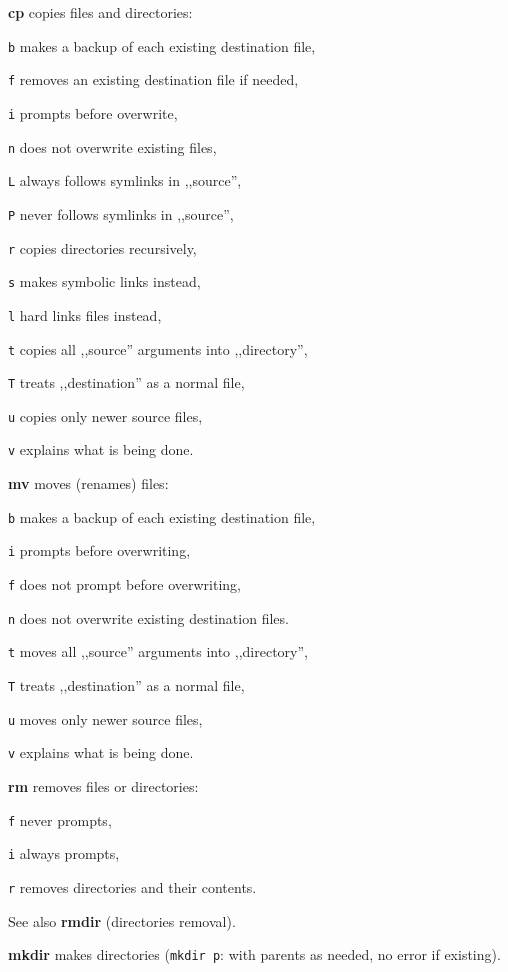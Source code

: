 \begin{enumx}
	\item [\cmdblack] \textbf{cp} copies files and directories:
	\item [\texttt{b}] makes a backup of each existing destination file,
	\item [\texttt{f}] removes an existing destination file if needed,
	\item [\texttt{i}] prompts before overwrite,
	\item [\texttt{n}] does not overwrite existing files,
	\item [\texttt{L}] always follows symlinks in ,,source'',
	\item [\texttt{P}] never follows symlinks in ,,source'',
	\item [\texttt{r}] copies directories recursively,
	\item [\texttt{s}] makes symbolic links instead,
	\item [\texttt{l}] hard links files instead,
	\item [\texttt{t}] copies all ,,source'' arguments into ,,directory'',
	\item [\texttt{T}] treats ,,destination'' as a normal file,
	\item [\texttt{u}] copies only newer source files,
	\item [\texttt{v}] explains what is being done.
	
	\item [\cmdblack] \textbf{mv} moves (renames) files:
	\item [\texttt{b}] makes a backup of each existing destination file,
	\item [\texttt{i}] prompts before overwriting,
	\item [\texttt{f}] does not prompt before overwriting,
	\item [\texttt{n}] does not overwrite existing destination files.
	\item [\texttt{t}] moves all ,,source'' arguments into ,,directory'',
	\item [\texttt{T}] treats ,,destination'' as a normal file,
	\item [\texttt{u}] moves only newer source files,
	\item [\texttt{v}] explains what is being done.
	
	\item [\cmdblack] \textbf{rm} removes files or directories:
	\item [\texttt{f}] never prompts,
	\item [\texttt{i}] always prompts,
	\item [\texttt{r}] removes directories and their contents.

	\item [\cmdblack] See also \textbf{rmdir} (directories removal).

	\item [\cmdblack] \textbf{mkdir} makes directories 
	(\texttt{mkdir p}: with parents as needed, no error if existing).
\end{enumx}

